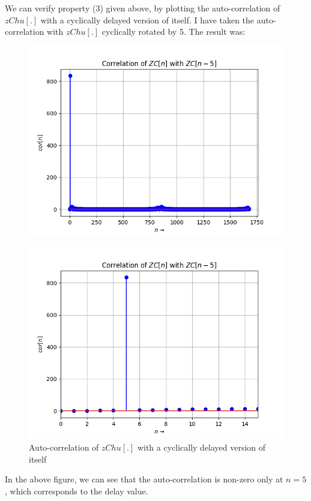 \documentclass[12pt, a4paper, twoside]{article}
\begin{document}
We can verify property (3) given above, by plotting the auto-correlation of $zChu[.]$ with a cyclically delayed version of itself. I have taken the auto-correlation with $zChu[.]$ cyclically rotated by 5. The result was:
\begin{figure}[H]
    \centering
    \includegraphics[scale=0.5]{Fig7.png}
    \label{fig:Fig7}
\end{figure}
\begin{figure}[H]
    \centering
    \includegraphics[scale=0.5]{Fig8.png}
    \caption{Auto-correlation of $zChu[.]$ with a cyclically delayed version of itself}
    \label{fig:Fig7}
\end{figure}
In the above figure, we can see that the auto-correlation is non-zero only at $n=5$, which corresponds to the delay value.
\end{document}
